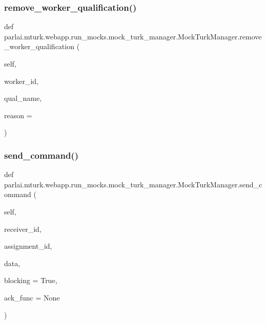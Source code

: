 \subsubsection{\texorpdfstring{remove\+\_\+worker\+\_\+qualification()}{remove\_worker\_qualification()}}
{\footnotesize\ttfamily def parlai.\+mturk.\+webapp.\+run\+\_\+mocks.\+mock\+\_\+turk\+\_\+manager.\+Mock\+Turk\+Manager.\+remove\+\_\+worker\+\_\+qualification (\begin{DoxyParamCaption}\item[{}]{self,  }\item[{}]{worker\+\_\+id,  }\item[{}]{qual\+\_\+name,  }\item[{}]{reason = {\ttfamily \textquotesingle{}\textquotesingle{}} }\end{DoxyParamCaption})}

\mbox{\label{classparlai_1_1mturk_1_1webapp_1_1run__mocks_1_1mock__turk__manager_1_1MockTurkManager_a986d0bdeec4969b35e47c0766c3db571}} 
\subsubsection{\texorpdfstring{send\+\_\+command()}{send\_command()}}
{\footnotesize\ttfamily def parlai.\+mturk.\+webapp.\+run\+\_\+mocks.\+mock\+\_\+turk\+\_\+manager.\+Mock\+Turk\+Manager.\+send\+\_\+command (\begin{DoxyParamCaption}\item[{}]{self,  }\item[{}]{receiver\+\_\+id,  }\item[{}]{assignment\+\_\+id,  }\item[{}]{data,  }\item[{}]{blocking = {\ttfamily True},  }\item[{}]{ack\+\_\+func = {\ttfamily None} }\end{DoxyParamCaption})}

